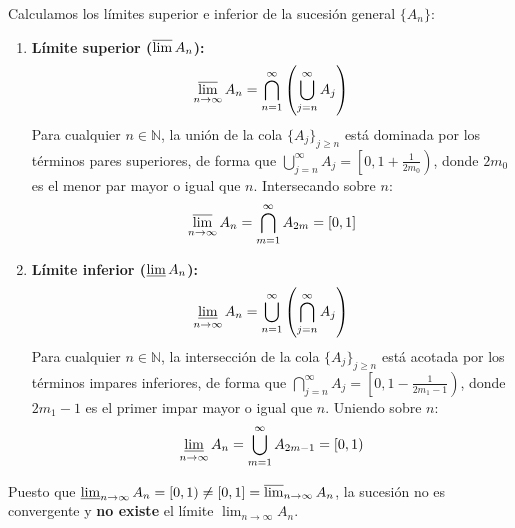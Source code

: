 \begin{problema}
Calculamos los límites superior e inferior de la sucesión general $\{A_n\}$:
\begin{enumerate}[label=\arabic*.]
    \item \textbf{Límite superior ($\varlimsup A_n$):}
    \[
        \varlimsup_{n \to \infty} A_n = \bigcap_{n=1}^\infty \left( \bigcup_{j=n}^\infty A_j \right)
    \]
    Para cualquier $n \in \mathbb{N}$, la unión de la cola $\{A_j\}_{j \ge n}$ está dominada por los términos pares superiores, de forma que $\bigcup_{j=n}^\infty A_j = \left[ 0, 1 + \frac{1}{2m_0} \right)$, donde $2m_0$ es el menor par mayor o igual que $n$. Intersecando sobre $n$:
    \[
        \varlimsup_{n \to \infty} A_n = \bigcap_{m=1}^\infty A_{2m} = [0, 1]
    \]

    \item \textbf{Límite inferior ($\varliminf A_n$):}
    \[
        \varliminf_{n \to \infty} A_n = \bigcup_{n=1}^\infty \left( \bigcap_{j=n}^\infty A_j \right)
    \]
    Para cualquier $n \in \mathbb{N}$, la intersección de la cola $\{A_j\}_{j \ge n}$ está acotada por los términos impares inferiores, de forma que $\bigcap_{j=n}^\infty A_j = \left[ 0, 1 - \frac{1}{2m_1 - 1} \right)$, donde $2m_1 - 1$ es el primer impar mayor o igual que $n$. Uniendo sobre $n$:
    \[
        \varliminf_{n \to \infty} A_n = \bigcup_{m=1}^\infty A_{2m-1} = [0, 1)
    \]
\end{enumerate}

Puesto que $\varliminf_{n \to \infty} A_n = [0, 1) \neq [0, 1] = \varlimsup_{n \to \infty} A_n$, la sucesión no es convergente y \textbf{no existe} el límite $\lim_{n \to \infty} A_n$.
\end{problema}
\newpage
